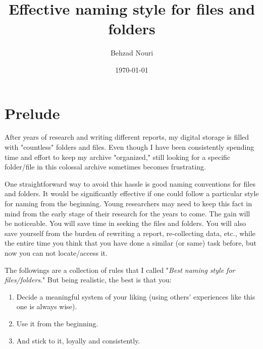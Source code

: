 \documentclass[12pt,letterpaper]{article}
\title{Effective naming style for files and folders}
\author{Behzad Nouri}
\date{\today}
\begin{document}
\maketitle
\section{Prelude}
After years of research and writing different reports, my digital storage is filled with "countless" folders and files. Even though I have been consistently spending time and effort to keep my archive "organized,"  still looking for a specific folder/file in this colossal archive sometimes becomes frustrating. 

One straightforward way to avoid this hassle is good naming conventions for files and folders. It would be significantly effective if one could follow a particular style for naming from the beginning. Young researchers may need to keep this fact in mind from the early stage of their research for the years to come. The gain will be noticeable. You will save time in seeking the files and folders. You will also save yourself from the burden of rewriting a report, re-collecting data, etc., while the entire time you think that you have done a similar (or same) task before, but now you can not locate/access it.

The followings are a collection of rules that I called "\emph{Best naming style for files/folders}." But being realistic, the best is that you:
\begin{enumerate}[label=\textbf{\arabic*.}]
\setlength\itemsep{-1pt}
\item Decide a meaningful system of your liking (using others' experiences like this one is always wise).
\item Use it from the beginning.
\item And stick to it, loyally and consistently. 
\end{enumerate}
 
 \newpage
\end{document}
